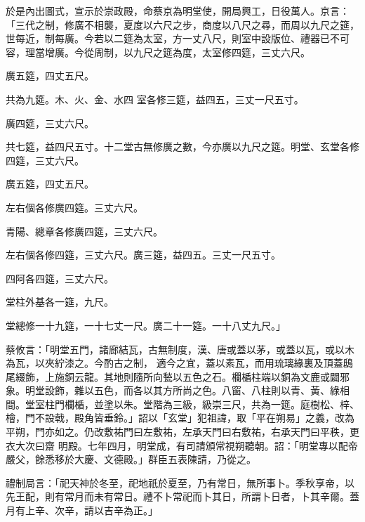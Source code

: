 \begin{pinyinscope}
 於是內出圖式，宣示於崇政殿，命蔡京為明堂使，開局興工，日役萬人。京言：「三代之制，修廣不相襲，夏度以六尺之步，商度以八尺之尋，而周以九尺之筵，世每近，制每廣。今若以二筵為太室，方一丈八尺，則室中設版位、禮器已不可容，理當增廣。今從周制，以九尺之筵為度，太室修四筵，三丈六尺。



 廣五筵，四丈五尺。



 共為九筵。木、火、金、水四
 室各修三筵，益四五，三丈一尺五寸。



 廣四筵，三丈六尺。



 共七筵，益四尺五寸。十二堂古無修廣之數，今亦廣以九尺之筵。明堂、玄堂各修四筵，三丈六尺。



 廣五筵，四丈五尺。



 左右個各修廣四筵。三丈六尺。



 青陽、總章各修廣四筵，三丈六尺。



 左右個各修四筵，三丈六尺。廣三筵，益四五。三丈一尺五寸。



 四阿各四筵，三丈六尺。



 堂柱外基各一筵，九尺。



 堂總修一十九筵，一十七丈一尺。廣二十一筵。一十八丈九尺。」



 蔡攸言：「明堂五門，諸廊結瓦，古無制度，漢、唐或蓋以茅，或蓋以瓦，或以木為瓦，以夾紵漆之。今酌古之制，
 適今之宜，蓋以素瓦，而用琉璃緣裏及頂蓋鴟尾綴飾，上施銅云龍。其地則隨所向甃以五色之石。欄楯柱端以銅為文鹿或闢邪象。明堂設飾，雜以五色，而各以其方所尚之色。八窗、八柱則以青、黃、綠相間。堂室柱門欄楯，並塗以朱。堂階為三級，級崇三尺，共為一筵。庭樹松、梓、檜，門不設戟，殿角皆垂鈴。」詔以「玄堂」犯祖諱，取「平在朔易」之義，改為平朔，門亦如之。仍改敷祐門曰左敷祐，左承天門曰右敷祐，右承天門曰平秩，更衣大次曰齋
 明殿。七年四月，明堂成，有司請頒常視朔聽朝。詔：「明堂專以配帝嚴父，餘悉移於大慶、文德殿。」群臣五表陳請，乃從之。



 禮制局言：「祀天神於冬至，祀地祇於夏至，乃有常日，無所事卜。季秋享帝，以先王配，則有常月而未有常日。禮不卜常祀而卜其日，所謂卜日者，卜其辛爾。蓋月有上辛、次辛，請以吉辛為正。」




\end{pinyinscope}
